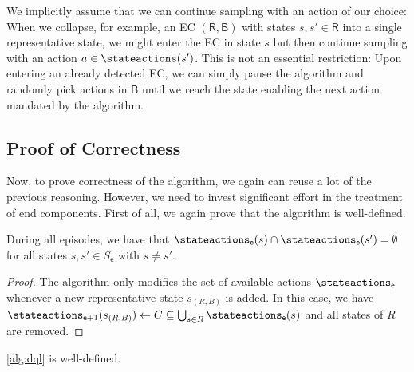 \documentclass{article}
\newcommand{\intersectionSym}{\cap}
\newcommand{\intersectionBin}{\mathbin{\intersectionSym}}
\newcommand{\UnionSym}{\bigcup}
\newcommand{\intersection}{\intersectionBin}
\newcommand{\Union}{\UnionSym}
\newcommand{\States}{S}
\newcommand{\algoepisode}{\mathsf{e}}
\begin{document}
\begin{remark}
	We implicitly assume that we can continue sampling with an action of our choice:
	When we collapse, for example, an EC $(\mathsf{R}, \mathsf{B})$ with states $s, s' \in \mathsf{R}$ into a single representative state, we might enter the EC in state $s$ but then continue sampling with an action $a \in \stateactions(s')$.
	This is not an essential restriction:
	Upon entering an already detected EC, we can simply pause the algorithm and randomly pick actions in $\mathsf{B}$ until we reach the state enabling the next action mandated by the algorithm.
\end{remark}

\subsection{Proof of Correctness}
Now, to prove correctness of the algorithm, we again can reuse a lot of the previous reasoning.
However, we need to invest significant effort in the treatment of end components.
First of all, we again prove that the algorithm is well-defined.
\begin{lemma} \label{stm:dql:disjoint_actions}
	During all episodes, we have that $\stateactions_{\algoepisode}(s) \intersection \stateactions_{\algoepisode}(s') = \emptyset$ for all states $s, s' \in \States_\algoepisode$ with $s \neq s'$.
\end{lemma}

\begin{proof}
	The algorithm only modifies the set of available actions $\stateactions_{\algoepisode}$ whenever a new representative state $s_{(R, B)}$ is added.
	In this case, we have $\stateactions_{\algoepisode + 1}(s_{(R, B)}) \gets C \subseteq \Union_{s \in R} \stateactions_{\algoepisode}(s)$ and all states of $R$ are removed. 
\end{proof}

\begin{lemma}
	\cref{alg:dql} is well-defined.
\end{lemma}
\end{document}

